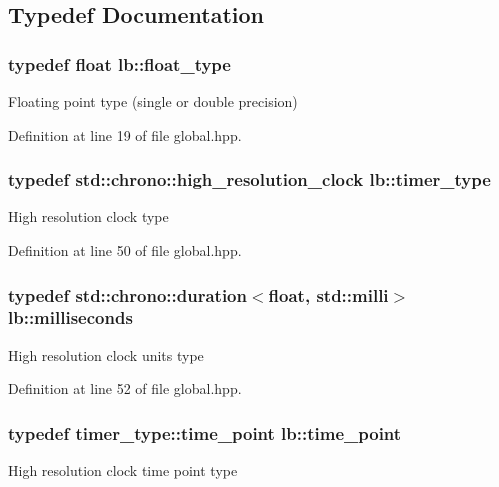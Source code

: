 \subsection{\-Typedef \-Documentation}
\hypertarget{namespacelb_a2b37d1585aef2d3da421ad0aedc6b11b}{
\subsubsection[{float\-\_\-type}]{\setlength{\rightskip}{0pt plus 5cm}typedef float {\bf lb\-::float\-\_\-type}}}\label{namespacelb_a2b37d1585aef2d3da421ad0aedc6b11b}
\-Floating point type (single or double precision) 

\-Definition at line 19 of file global.\-hpp.

\hypertarget{namespacelb_a1acb659edeec66aceb5403fd0b90942c}{
\subsubsection[{timer\-\_\-type}]{\setlength{\rightskip}{0pt plus 5cm}typedef std\-::chrono\-::high\-\_\-resolution\-\_\-clock {\bf lb\-::timer\-\_\-type}}}\label{namespacelb_a1acb659edeec66aceb5403fd0b90942c}
\-High resolution clock type 

\-Definition at line 50 of file global.\-hpp.

\hypertarget{namespacelb_a91eab8920da42c1c74728a490c58ec76}{
\subsubsection[{milliseconds}]{\setlength{\rightskip}{0pt plus 5cm}typedef std\-::chrono\-::duration$<$float, std\-::milli$>$ {\bf lb\-::milliseconds}}}\label{namespacelb_a91eab8920da42c1c74728a490c58ec76}
\-High resolution clock units type 

\-Definition at line 52 of file global.\-hpp.

\hypertarget{namespacelb_a664b98bd4013970d2005405e23ef78d9}{
\subsubsection[{time\-\_\-point}]{\setlength{\rightskip}{0pt plus 5cm}typedef timer\-\_\-type\-::time\-\_\-point {\bf lb\-::time\-\_\-point}}}\label{namespacelb_a664b98bd4013970d2005405e23ef78d9}
\-High resolution clock time point type 

